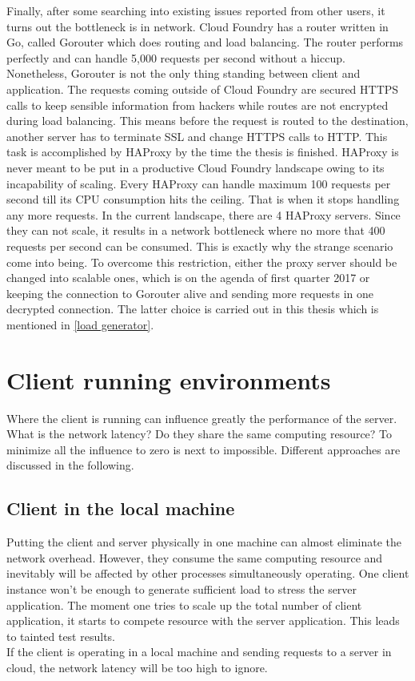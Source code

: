 Finally, after some searching into existing issues reported from other users, it turns out the bottleneck is in network. Cloud Foundry has a router written in Go, called Gorouter  \citep{Gorouter} which does routing and load balancing. The router performs perfectly and can handle 5,000 requests per second without a hiccup. Nonetheless, Gorouter is not the only thing standing between client and application. The requests coming outside of Cloud Foundry are secured HTTPS calls to keep sensible information from hackers while routes are not encrypted during load balancing. This means before the request is routed to the destination, another server has to terminate SSL and change HTTPS calls to HTTP. This task is accomplished by \ac{HAProxy} \citep{HAProxy} by the time the thesis is finished. HAProxy is never meant to be put in a productive Cloud Foundry landscape owing to its incapability of scaling. Every HAProxy can handle maximum 100 requests per second till its CPU consumption hits the ceiling. That is when it stops handling any more requests. In the current landscape, there are 4 HAProxy servers. Since they can not scale, it results in a network bottleneck where no more that 400 requests per second can be consumed. This is exactly why the strange scenario come into being. To overcome this restriction, either the proxy server should be changed into scalable ones, which is on the agenda of first quarter 2017 or keeping the connection to Gorouter alive and sending more requests in one decrypted connection. The latter choice is carried out in this thesis which is mentioned in \ref{load generator}.


\section{ Client running environments}
Where the client is running can influence greatly the performance of the server. What is the network latency? Do they share the same computing resource? To minimize all the influence to zero is next to impossible. Different approaches are discussed in the following. 

\subsection{Client in the local machine }
Putting the client and server physically in one machine can almost eliminate the network overhead. However, they consume the same computing resource and inevitably will be affected by other processes simultaneously operating. One client instance won't be enough to generate sufficient load to stress the server application. The moment one tries to scale up the total number of client application, it starts to compete resource with the server application. This leads to tainted test results. \\ 
If the client is operating in a local machine and sending requests to a server in cloud, the network latency will be too high to ignore.  
